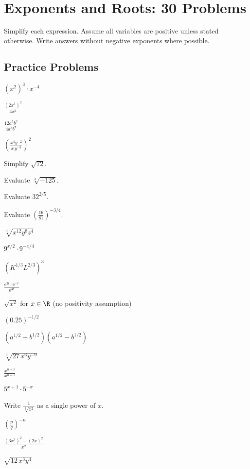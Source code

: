 \chapter{Exponents and Roots: 30 Problems}

Simplify each expression. Assume all variables are positive unless stated
otherwise. Write answers without negative exponents where possible.

\section{Practice Problems}

\begin{problems}
  \item $(x^{2})^{3}\cdot x^{-4}$
  \item $\displaystyle\frac{(2x^{3})^{2}}{4x^{4}}$
  \item $\displaystyle\frac{12a^{5}b^{2}}{4a^{3}b^{7}}$
  \item $\displaystyle\left(\frac{x^{4}y^{-2}}{x\,y^{-5}}\right)^{2}$
  \item Simplify $\sqrt{72}$.
  \item Evaluate $\sqrt[3]{-125}$.
  \item Evaluate $32^{2/5}$.
  \item Evaluate $\displaystyle\left(\frac{16}{81}\right)^{-3/4}$.
  \item $\sqrt[4]{x^{12}y^{8}z^{4}}$
  \item $9^{x/2}\cdot 9^{-x/4}$
  \item $(K^{1/3}L^{2/3})^{3}$
  \item $\displaystyle\frac{\mathrm{e}^{2t}\cdot \mathrm{e}^{-t}}{\mathrm{e}^{3t}}$
  \item $\sqrt{x^{2}}$ for $x\in\R$ (no positivity assumption)
  \item $(0.25)^{-1/2}$
  \item $(a^{1/2}+b^{1/2})(a^{1/2}-b^{1/2})$
  \item $\sqrt[3]{27\,x^{6}y^{-9}}$
  \item $\displaystyle\frac{x^{n+1}}{x^{n-1}}$
  \item $5^{x+1}\cdot 5^{-x}$
  \item Write $\displaystyle\frac{1}{\sqrt[3]{x^{2}}}$ as a single power of $x$.
  \item $\displaystyle\left(\frac{p}{q}\right)^{-n}$
  \item $\displaystyle\frac{(3x^{2})^{2}-(2x)^{2}}{x^{2}}$
  \item $\sqrt{12\,x^{3}y^{4}}$

\end{problems}
